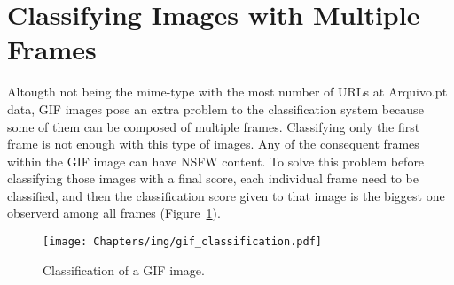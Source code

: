 
\section{Classifying Images with Multiple Frames}

Altougth not being the mime-type with the most number of URLs at Arquivo.pt data, GIF images pose an extra problem to the classification system because some of them can be composed of multiple frames. Classifying only the first frame is not enough with this type of images. Any of the consequent frames within the GIF image can have  NSFW content.
To solve this problem before classifying those images with a final score, each individual frame need to be classified, and then the classification score given to that image is the biggest one observerd among all frames (Figure~\ref{fig:gif_classification}).

\begin{figure}[H]
    \centering
    \texttt{[image: Chapters/img/gif\_classification.pdf]}
    \caption{Classification of a GIF image.}
    \label{fig:gif_classification}
\end{figure}


